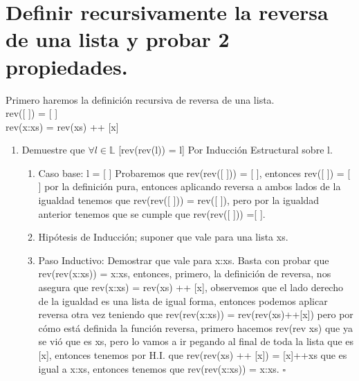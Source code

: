 \documentclass[11pt,letterpaper]{article}
\newcommand*{\QEDB}{\hfill\ensuremath{\square}}%
\newcommand\tab[1][1cm]{\hspace*{#1}}
\begin{document}
\section{Definir recursivamente la reversa de una lista y probar 2 propiedades.}

Primero haremos la definición recursiva de reversa de una lista.\\
\tab rev([ ]) = [ ]\\
\tab rev(x:xs) = rev(xs) ++ [x]

\begin{enumerate}
\item Demuestre que $\forall l \in\mathbb{L}$ [rev(rev(l)) = l]
Por Inducción Estructural sobre l.
\begin{enumerate}
\item Caso base: l = [ ]
Probaremos que rev(rev([ ])) = [ ], entonces rev([ ]) = [ ] por la definición pura, entonces aplicando reversa a ambos lados de la igualdad tenemos que rev(rev([ ])) = rev([ ]), pero por la igualdad anterior tenemos que se cumple que rev(rev([ ])) =[ ].
\item Hipótesis de Inducción; suponer que vale para una lista xs.
\item Paso Inductivo: Demostrar que vale para x:xs.
Basta con probar que rev(rev(x:xs)) = x:xs, entonces, primero, la definición de reversa, nos asegura que rev(x:xs) = rev(xs) ++ [x], observemos que el lado derecho de la igualdad es una lista de igual forma, entonces podemos aplicar reversa otra vez teniendo que rev(rev(x:xs)) = rev(rev(xs)++[x]) pero por cómo está definida la función reversa, primero hacemos rev(rev xs) que ya se vió que es xs, pero lo vamos a ir pegando al final de toda la lista que es [x], entonces tenemos por H.I. que rev(rev(xs) ++ [x]) = [x]++xs que es igual a x:xs, entonces tenemos que rev(rev(x:xs)) = x:xs.
\QEDB
\end{enumerate}
\end{enumerate}
\end{document}
